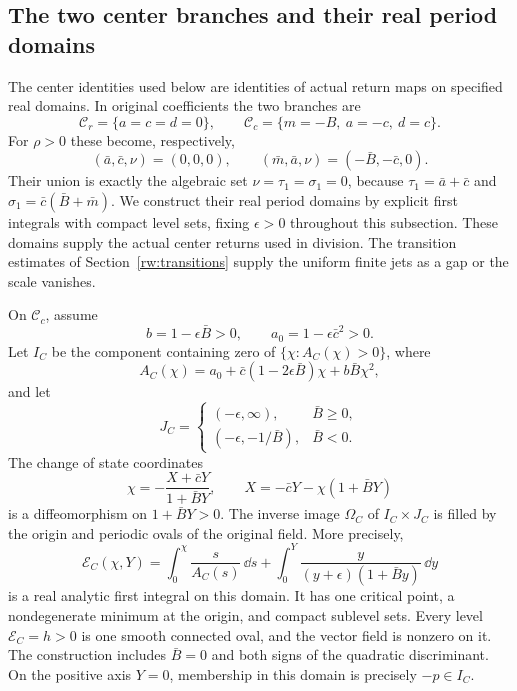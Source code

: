 \subsection{The two center branches and their real period domains}

The center identities used below are identities of actual return maps
on specified real domains. In original coefficients the two branches
are
\[
 \mathcal C_r=\{a=c=d=0\},\qquad
 \mathcal C_c=\{m=-B,\ a=-c,\ d=c\}.
\]
For $\rho>0$ these become, respectively,
\[
 (\bar a,\bar c,\nu)=(0,0,0),\qquad
 (\bar m,\bar a,\nu)=(-\bar B,-\bar c,0).
\]
Their union is exactly the algebraic set
$\nu=\tau_1=\sigma_1=0$, because
$\tau_1=\bar a+\bar c$ and
$\sigma_1=\bar c(\bar B+\bar m)$.
We construct their real period domains by explicit first integrals with
compact level sets, fixing $\epsilon>0$ throughout this subsection.
These domains supply the actual center returns used in division.
The transition estimates of Section~\ref{rw:transitions} supply the
uniform finite jets as a gap or the scale vanishes.

\begin{proposition}\label{rw:real-centers}
On $\mathcal C_c$, assume
\[
 b=1-\epsilon\bar B>0,\qquad a_0=1-\epsilon\bar c^2>0.
\]
Let $I_C$ be the component containing zero of
$\{\chi:A_C(\chi)>0\}$, where
\begin{equation}\label{rw:centers:separated-polynomial}
 A_C(\chi)=a_0+\bar c(1-2\epsilon\bar B)\chi
                       +b\bar B\chi^2,
\end{equation}
and let
\[
 J_C=\begin{cases}
 (-\epsilon,\infty),&\bar B\ge0,\\
 (-\epsilon,-1/\bar B),&\bar B<0.
 \end{cases}
\]
The change of state coordinates
\begin{equation}\label{rw:centers:separated-coordinate}
 \chi=-\frac{X+\bar cY}{1+\bar BY},\qquad
 X=-\bar cY-\chi(1+\bar BY)
\end{equation}
is a diffeomorphism on $1+\bar BY>0$. The inverse image
$\Omega_C$ of $I_C\times J_C$ is filled by the origin and periodic
ovals of the original field. More precisely,
\begin{equation}\label{rw:centers:separated-energy}
 \mathcal E_C(\chi,Y)
 =\int_0^\chi\frac{s}{A_C(s)}\,\dd s
   +\int_0^Y\frac{y}{(y+\epsilon)(1+\bar By)}\,\dd y
\end{equation}
is a real analytic first integral on this domain. It has one critical
point, a nondegenerate minimum at the origin, and compact sublevel
sets. Every level $\mathcal E_C=h>0$ is one smooth connected oval,
and the vector field is nonzero on it.
The construction includes $\bar B=0$ and both signs of the
quadratic discriminant. On the positive axis $Y=0$, membership in
this domain is precisely $-p\in I_C$.
\end{proposition}

